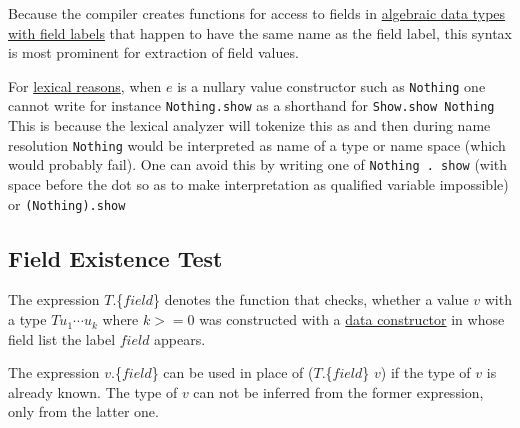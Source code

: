 Because the compiler creates functions for access to fields in \hyperref[fieldconstructor]{algebraic data types with field labels} that happen to have the same name as the field label, this syntax is most prominent for extraction of field values.

\label{confusedots}For \hyperref[qualified names]{lexical reasons}, when $e$ is a nullary value constructor such as \texttt{Nothing} one cannot write for instance \texttt{Nothing.show} as a shorthand for \texttt{Show.show Nothing}
This is because the lexical analyzer will tokenize this as 
and then during name resolution \texttt{Nothing} would be interpreted as name of a type or name space (which would probably fail).
One can avoid this by writing one of \texttt{Nothing . show} (with space before the dot so as to make interpretation as qualified variable impossible) or \texttt{(Nothing).show}

\subsection{Field Existence Test} \label{field existence}

The expression $T$.\{$field$\} denotes the function that checks, whether a value $v$ with a type $T u_1 \cdots u_k$  where $k>=0$ was constructed with a \hyperref[fieldconstructor]{data constructor} in whose field list the label $field$ appears.

The expression $v$.\{$field$\} can be used in place of  ($T$.\{$field$\} $v$) if the type of $v$ is already known. The type of $v$ can not be inferred from the former expression, only from the latter one.


